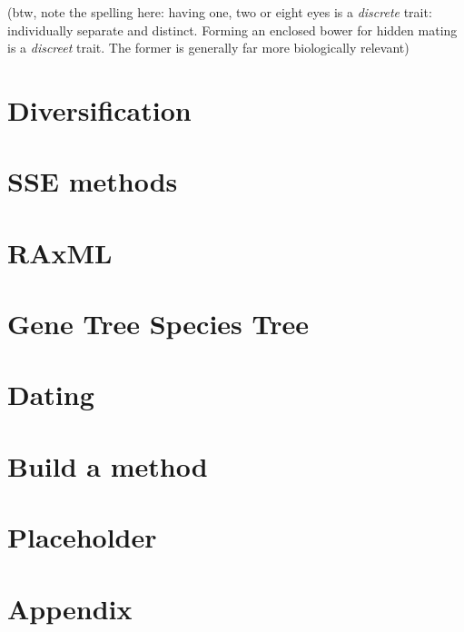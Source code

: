 \documentclass[]{book}
\theoremstyle{definition}
\theoremstyle{definition}
\theoremstyle{remark}
\begin{document}
(btw, note the spelling here: having one, two or eight eyes is a
\emph{discrete} trait: individually separate and distinct. Forming an
enclosed bower for hidden mating is a \emph{discreet} trait. The former
is generally far more biologically relevant)

\chapter{Diversification}\label{diversification}

\chapter{SSE methods}\label{sse-methods}

\chapter{RAxML}\label{raxml}

\chapter{Gene Tree Species Tree}\label{gene-tree-species-tree}

\chapter{Dating}\label{dating}

\chapter{Build a method}\label{build-a-method}

\chapter{Placeholder}\label{placeholder}

\chapter{Appendix}\label{appendix}


\end{document}
